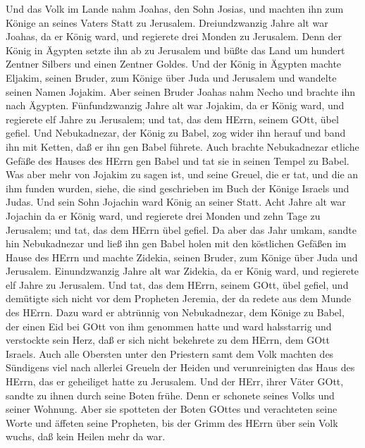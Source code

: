  Und das Volk im Lande nahm Joahas, den Sohn Josias, und
machten ihn zum Könige an seines Vaters Statt zu Jerusalem. 
Dreiundzwanzig Jahre alt war Joahas, da er König ward, und regierete
drei Monden zu Jerusalem.  Denn der König in Ägypten setzte
ihn ab zu Jerusalem und büßte das Land um hundert Zentner Silbers und
einen Zentner Goldes.  Und der König in Ägypten machte
Eljakim, seinen Bruder, zum Könige über Juda und Jerusalem und wandelte
seinen Namen Jojakim. Aber seinen Bruder Joahas nahm Necho und brachte
ihn nach Ägypten.  Fünfundzwanzig Jahre alt war Jojakim, da
er König ward, und regierete elf Jahre zu Jerusalem; und tat, das dem
HErrn, seinem GOtt, übel gefiel.  Und Nebukadnezar, der
König zu Babel, zog wider ihn herauf und band ihn mit Ketten, daß er ihn
gen Babel führete.  Auch brachte Nebukadnezar etliche Gefäße
des Hauses des HErrn gen Babel und tat sie in seinen Tempel zu Babel.
 Was aber mehr von Jojakim zu sagen ist, und seine Greuel,
die er tat, und die an ihm funden wurden, siehe, die sind geschrieben im
Buch der Könige Israels und Judas. Und sein Sohn Jojachin ward König an
seiner Statt.  Acht Jahre alt war Jojachin da er König ward,
und regierete drei Monden und zehn Tage zu Jerusalem; und tat, das dem
HErrn übel gefiel.  Da aber das Jahr umkam, sandte hin
Nebukadnezar und ließ ihn gen Babel holen mit den köstlichen Gefäßen im
Hause des HErrn und machte Zidekia, seinen Bruder, zum Könige über Juda
und Jerusalem.  Einundzwanzig Jahre alt war Zidekia, da er
König ward, und regierete elf Jahre zu Jerusalem.  Und tat,
das dem HErrn, seinem GOtt, übel gefiel, und demütigte sich nicht vor
dem Propheten Jeremia, der da redete aus dem Munde des HErrn.
 Dazu ward er abtrünnig von Nebukadnezar, dem Könige zu
Babel, der einen Eid bei GOtt von ihm genommen hatte und ward
halsstarrig und verstockte sein Herz, daß er sich nicht bekehrete zu dem
HErrn, dem GOtt Israels.  Auch alle Obersten unter den
Priestern samt dem Volk machten des Sündigens viel nach allerlei Greueln
der Heiden und verunreinigten das Haus des HErrn, das er geheiliget
hatte zu Jerusalem.  Und der HErr, ihrer Väter GOtt, sandte
zu ihnen durch seine Boten frühe. Denn er schonete seines Volks und
seiner Wohnung.  Aber sie spotteten der Boten GOttes und
verachteten seine Worte und äffeten seine Propheten, bis der Grimm des
HErrn über sein Volk wuchs, daß kein Heilen mehr da war. 
